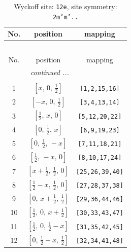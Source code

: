 \documentclass[fleqn,8pt]{jsarticle}
\begin{document}
\begin{longtable}{ccc}
\caption{Wyckoff site: {\tt 12e}, site symmetry: {\tt 2m'm'..}}
 \\
 \hline \hline
No. & position & mapping \\ \hline \endfirsthead

\multicolumn{2}{l}{\tablename\ \thetable{}} \\
 \hline \hline
No. & position & mapping \\ \hline \endhead

 \hline \hline
\multicolumn{2}{r}{\footnotesize\it continued ...} \\ \endfoot

 \hline \hline
\multicolumn{2}{r}{} \\ \endlastfoot

1 & $\left[ x,\, 0,\, \frac{1}{2} \right]$ & {\tt [1,2,15,16]} \\ \hline
2 & $\left[ - x,\, 0,\, \frac{1}{2} \right]$ & {\tt [3,4,13,14]} \\ \hline
3 & $\left[ \frac{1}{2},\, x,\, 0 \right]$ & {\tt [5,12,20,22]} \\ \hline
4 & $\left[ 0,\, \frac{1}{2},\, x \right]$ & {\tt [6,9,19,23]} \\ \hline
5 & $\left[ 0,\, \frac{1}{2},\, - x \right]$ & {\tt [7,11,18,21]} \\ \hline
6 & $\left[ \frac{1}{2},\, - x,\, 0 \right]$ & {\tt [8,10,17,24]} \\ \hline
7 & $\left[ x + \frac{1}{2},\, \frac{1}{2},\, 0 \right]$ & {\tt [25,26,39,40]} \\ \hline
8 & $\left[ \frac{1}{2} - x,\, \frac{1}{2},\, 0 \right]$ & {\tt [27,28,37,38]} \\ \hline
9 & $\left[ 0,\, x + \frac{1}{2},\, \frac{1}{2} \right]$ & {\tt [29,36,44,46]} \\ \hline
10 & $\left[ \frac{1}{2},\, 0,\, x + \frac{1}{2} \right]$ & {\tt [30,33,43,47]} \\ \hline
11 & $\left[ \frac{1}{2},\, 0,\, \frac{1}{2} - x \right]$ & {\tt [31,35,42,45]} \\ \hline
12 & $\left[ 0,\, \frac{1}{2} - x,\, \frac{1}{2} \right]$ & {\tt [32,34,41,48]} \\
\end{longtable}
\renewcommand{\arraystretch}{1.2}
\end{document}
